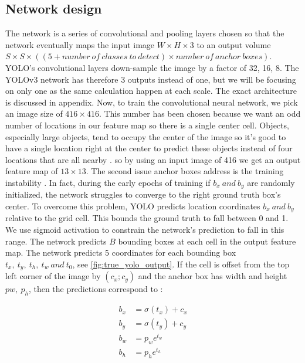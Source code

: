 \subsection{Network design}\label{sub:net_design}

The network is a series of convolutional and pooling layers chosen so that the network eventually maps the input image $W \times H \times 3$ to
an output volume $S \times S \times ((5 + number\ of\ classes\ to\ detect) \times number\ of\ anchor\ boxes)$. YOLO's convolutional layers down-sample the image by a factor of 32, 16, 8. The YOLOv3 network has therefore 3 outputs instead of one, but we will be focusing on only one as the same calculation happen at each scale. The exact architecture is discussed in appendix.
Now, to train the convolutional neural network, we pick an image size of $416 \times 416$.
This number has been chosen because we want an odd number of
locations in our feature map so there is a single center cell.
Objects, especially large objects, tend to occupy the center
of the image so it’s good to have a single location right at
the center to predict these objects instead of four locations
that are all nearby \cite{YOLOv2}.
so by using an input image of 416 we get an output feature map of $13 \times 13$.
The second issue anchor boxes address is the training instability \cite{YOLOv2}. In fact, during the early epochs of training if $b_{x}\ and\ b_{y}$ are randomly initialized, the network
struggles to converge to the right ground truth box's center. To overcome this problem, YOLO predicts location coordinates $b_{x}\ and\ b_{y}$ relative to the grid
cell. This bounds the ground truth to fall between 0 and 1. We use sigmoid activation to constrain the network's prediction to fall in this range.
The network predicts $B$ bounding boxes at each cell in the output feature map. The network predicts 5 coordinates for each bounding box $t_{x},\ t_{y},\ t_{h},\ t_{w}\ and\ t_{0}$, see \cref{fig:true_yolo_output}. If the cell is
offset from the top left corner of the image by $(c_{x}; c_{y})$ and
the anchor box has width and height $p{w},\ p_{h}$, then
the predictions correspond to \cite{YOLOv2}:

\begin{align}
  \label{bbox}
  b_{x} &= \sigma(t_{x}) + c_x \\
  b_{y} &= \sigma(t_{y}) + c_y \\
  b_{w} &= p_{w}e^{t_{w}} \\
  b_{h} &= p_{h}e^{t_{h}}
\end{align}


